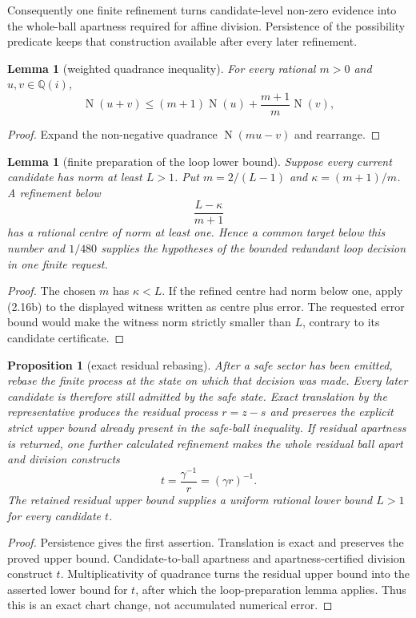 \documentclass[10pt]{article}
\newtheorem{lemma}[theorem]{Lemma}
\newtheorem{proposition}[theorem]{Proposition}
\theoremstyle{definition}
\theoremstyle{remark}
\newcommand{\Qi}{\mathbb{Q}(i)}
\newcommand{\Norm}{\operatorname{N}}
\begin{document}
Consequently one finite refinement turns candidate-level non-zero evidence
into the whole-ball apartness required for affine division.  Persistence of
the possibility predicate keeps that construction available after every
later refinement.

\begin{lemma}[weighted quadrance inequality]
For every rational $m>0$ and $u,v\in\Qi$,
\[
 \Norm(u+v)\le(m+1)\Norm(u)+\frac{m+1}{m}\Norm(v),
\tag{2.16b}
\]
\end{lemma}

\begin{proof}
Expand the non-negative quadrance $\Norm(mu-v)$ and rearrange.
\end{proof}

\begin{lemma}[finite preparation of the loop lower bound]
Suppose every current candidate has norm at least $L>1$.  Put
$m=2/(L-1)$ and $\kappa=(m+1)/m$.  A refinement below
\[
 \frac{L-\kappa}{m+1}
\]
has a rational centre of norm at least one.  Hence a common target below this
number and $1/480$ supplies the hypotheses of the bounded redundant loop
decision in one finite request.
\end{lemma}

\begin{proof}
The chosen $m$ has $\kappa<L$.  If the refined centre had norm below one, apply
(2.16b) to the displayed witness written as centre plus error.  The requested
error bound would make the witness norm strictly smaller than $L$, contrary
to its candidate certificate.
\end{proof}

\begin{proposition}[exact residual rebasing]
After a safe sector has been emitted, rebase the finite process at the
state on which that decision was made.  Every later candidate is therefore
still admitted by the safe state.  Exact translation by the representative
produces the residual process $r=z-s$ and preserves the explicit strict upper
bound already present in the safe-ball inequality.  If residual apartness is
returned, one further calculated refinement makes the whole residual ball
apart and division constructs
\[
 t=\frac{\gamma^{-1}}r=(\gamma r)^{-1}.
\]
The retained residual upper bound supplies a uniform rational lower bound
$L>1$ for every candidate $t$.
\end{proposition}

\begin{proof}
Persistence gives the first assertion.  Translation is exact and preserves
the proved upper bound.  Candidate-to-ball apartness and
apartness-certified division construct $t$.  Multiplicativity of quadrance
turns the residual upper bound into the asserted lower bound for $t$, after
which the loop-preparation lemma applies.  Thus this is an exact chart
change, not accumulated numerical error.
\end{proof}
\end{document}
